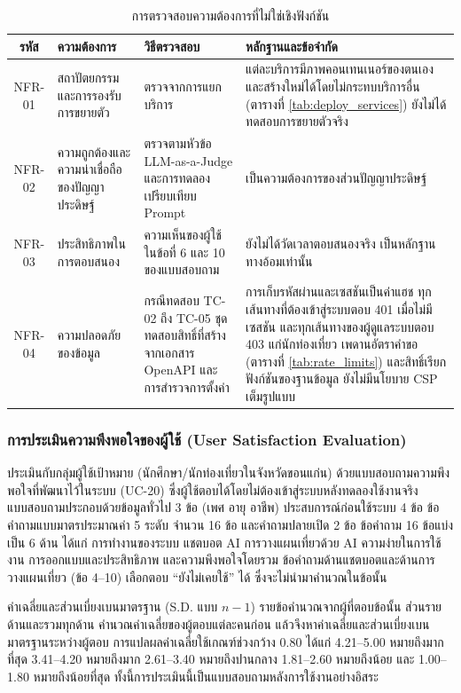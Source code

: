 \nopagebreak
\begin{table}[H]
\centering
\caption{การตรวจสอบความต้องการที่ไม่ใช่เชิงฟังก์ชัน}
\label{tab:nfr_verify}
\begin{tabular}{|c|p{3cm}|p{4.2cm}|p{4.6cm}|}
\hline
\textbf{รหัส} & \textbf{ความต้องการ} & \textbf{วิธีตรวจสอบ} & \textbf{หลักฐานและข้อจำกัด} \\
\hline
NFR-01 & สถาปัตยกรรมและการรองรับการขยายตัว & ตรวจจากการแยกบริการ & แต่ละบริการมีภาพคอนเทนเนอร์ของตนเองและสร้างใหม่ได้โดยไม่กระทบบริการอื่น (ตารางที่ \ref{tab:deploy_services}) ยังไม่ได้ทดสอบการขยายตัวจริง \\ \hline
NFR-02 & ความถูกต้องและความน่าเชื่อถือของปัญญาประดิษฐ์ & ตรวจตามหัวข้อ LLM-as-a-Judge และการทดลองเปรียบเทียบ Prompt & เป็นความต้องการของส่วนปัญญาประดิษฐ์ \\ \hline
NFR-03 & ประสิทธิภาพในการตอบสนอง & ความเห็นของผู้ใช้ในข้อที่ 6 และ 10 ของแบบสอบถาม & ยังไม่ได้วัดเวลาตอบสนองจริง เป็นหลักฐานทางอ้อมเท่านั้น \\ \hline
NFR-04 & ความปลอดภัยของข้อมูล & กรณีทดสอบ TC-02 ถึง TC-05 ชุดทดสอบสิทธิ์ที่สร้างจากเอกสาร OpenAPI และการสำรวจการตั้งค่า & การเก็บรหัสผ่านและเซสชันเป็นค่าแฮช ทุกเส้นทางที่ต้องเข้าสู่ระบบตอบ 401 เมื่อไม่มีเซสชัน และทุกเส้นทางของผู้ดูแลระบบตอบ 403 แก่นักท่องเที่ยว เพดานอัตราคำขอ (ตารางที่ \ref{tab:rate_limits}) และสิทธิ์เรียกฟังก์ชันของฐานข้อมูล ยังไม่มีนโยบาย CSP เต็มรูปแบบ \\ \hline
\end{tabular}
\end{table}

\subsubsection{การประเมินความพึงพอใจของผู้ใช้ (User Satisfaction Evaluation)}

ประเมินกับกลุ่มผู้ใช้เป้าหมาย (นักศึกษา/นักท่องเที่ยวในจังหวัดขอนแก่น) ด้วยแบบสอบถามความพึงพอใจที่พัฒนาไว้ในระบบ (UC-20) ซึ่งผู้ใช้ตอบได้โดยไม่ต้องเข้าสู่ระบบหลังทดลองใช้งานจริง แบบสอบถามประกอบด้วยข้อมูลทั่วไป 3 ข้อ (เพศ อายุ อาชีพ) ประสบการณ์ก่อนใช้ระบบ 4 ข้อ ข้อคำถามแบบมาตรประมาณค่า 5 ระดับ จำนวน 16 ข้อ และคำถามปลายเปิด 2 ข้อ ข้อคำถาม 16 ข้อแบ่งเป็น 6 ด้าน ได้แก่ การทำงานของระบบ แชตบอต AI การวางแผนเที่ยวด้วย AI ความง่ายในการใช้งาน การออกแบบและประสิทธิภาพ และความพึงพอใจโดยรวม ข้อคำถามด้านแชตบอตและด้านการวางแผนเที่ยว (ข้อ 4--10) เลือกตอบ ``ยังไม่เคยใช้'' ได้ ซึ่งจะไม่นำมาคำนวณในข้อนั้น

ค่าเฉลี่ยและส่วนเบี่ยงเบนมาตรฐาน (S.D. แบบ $n-1$) รายข้อคำนวณจากผู้ที่ตอบข้อนั้น ส่วนรายด้านและรวมทุกด้าน คำนวณค่าเฉลี่ยของผู้ตอบแต่ละคนก่อน แล้วจึงหาค่าเฉลี่ยและส่วนเบี่ยงเบนมาตรฐานระหว่างผู้ตอบ การแปลผลค่าเฉลี่ยใช้เกณฑ์ช่วงกว้าง 0.80 \parencite{best1981} ได้แก่ 4.21--5.00 หมายถึงมากที่สุด 3.41--4.20 หมายถึงมาก 2.61--3.40 หมายถึงปานกลาง 1.81--2.60 หมายถึงน้อย และ 1.00--1.80 หมายถึงน้อยที่สุด ทั้งนี้การประเมินนี้เป็นแบบสอบถามหลังการใช้งานอย่างอิสระ

